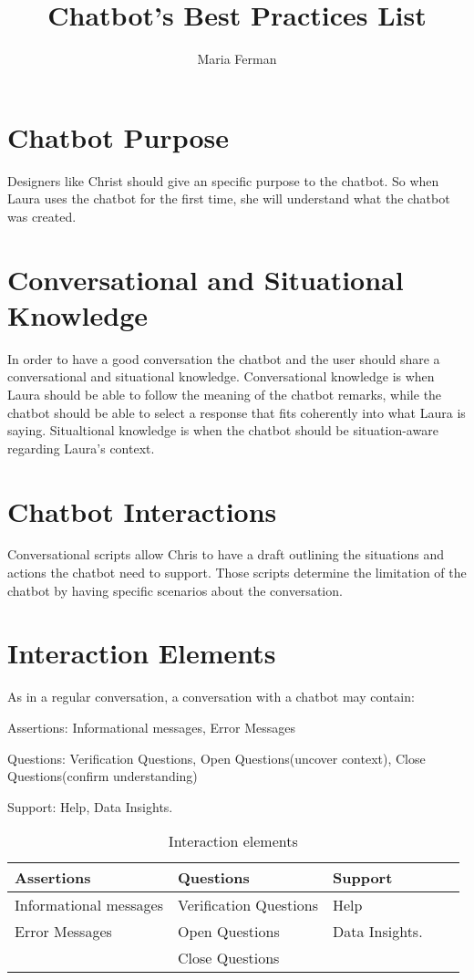 \documentclass[a4paper,10pt]{article}
\title{Chatbot's Best Practices List}
\author{Maria Ferman}
\begin{document}
\maketitle
\section{Chatbot Purpose}

Designers like Christ should give an specific purpose to the chatbot. So when Laura uses the chatbot for the first time, she will understand what the chatbot was created.

\section{Conversational and Situational Knowledge}

In order to have a good conversation the chatbot and the user should share a conversational and situational knowledge.  Conversational knowledge is when Laura should be able to follow the meaning of the chatbot remarks, while the chatbot should be able to select a response that fits coherently into what Laura is saying. Situaltional knowledge is when the chatbot should be situation-aware regarding Laura’s context.

\section{Chatbot Interactions}

Conversational scripts allow Chris to have a draft outlining the situations and actions the chatbot need to support. Those scripts determine the limitation of the chatbot by having specific scenarios about the conversation. 

\section{Interaction Elements}

As in a regular conversation, a conversation with a chatbot may contain:

Assertions: Informational messages, Error Messages

Questions: Verification Questions, Open Questions(uncover context), Close Questions(confirm understanding)

Support: Help, Data Insights.

\begin{table}[]
\centering

\label{InteractionElementsTable}
\begin{tabular}{lllll}
\hline
\textbf{Assertions}    & \textbf{Questions}     & \textbf{Support}   \\
\hline
Informational messages & Verification Questions & Help      \\
Error Messages         & Open Questions         & Data Insights.  \\
                       & Close Questions        &       \\
     \hline                   
\end{tabular}
\caption{Interaction elements}
\end{table}
\end{document}
